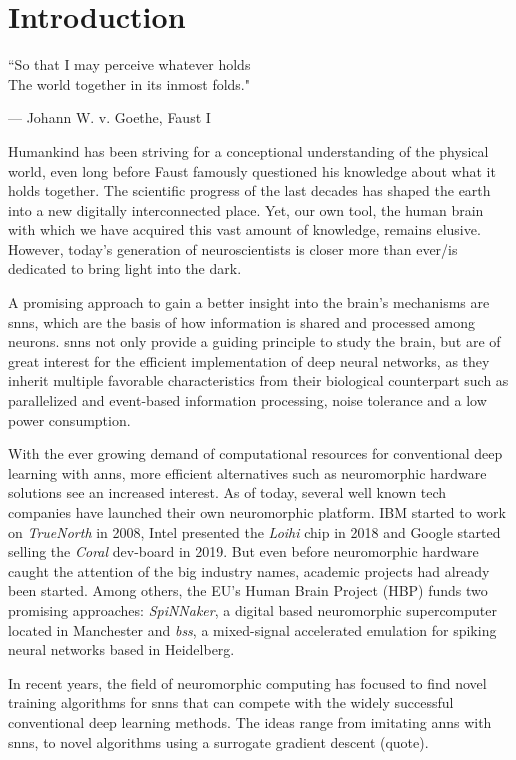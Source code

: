 \chapter*{Introduction}

\epigraph{``So that I may perceive whatever holds \\The world together in its inmost folds."}{--- \textup{Johann W. v. Goethe}, Faust I}

Humankind has been striving for a conceptional understanding of the physical world, even long before Faust famously questioned his knowledge about what it holds together. The scientific progress of the last decades has shaped the earth into a new digitally interconnected place. Yet, our own tool, the human brain with which we have acquired this vast amount of knowledge, remains elusive. However, today's generation of neuroscientists is closer more than ever/is dedicated to bring light into the dark.

A promising approach to gain a better insight into the brain's mechanisms are \glspl{snn}, which are the basis of how information is shared and processed among neurons. \glspl{snn} not only provide a guiding principle to study the brain, but are of great interest for the efficient implementation of deep neural networks, as they inherit multiple favorable characteristics from their biological counterpart such as parallelized and event-based information processing, noise tolerance and a low power consumption.

With the ever growing demand of computational resources for conventional deep learning with \glspl{ann}, more efficient alternatives such as neuromorphic hardware solutions see an increased interest. As of today, several well known tech companies have launched their own neuromorphic platform. IBM started to work on \emph{TrueNorth} in 2008, Intel presented the \emph{Loihi} chip in 2018 and Google started selling the \emph{Coral} dev-board in 2019. But even before neuromorphic hardware caught the attention of the big industry names, academic projects had already been started. Among others, the EU's Human Brain Project (HBP) funds two promising approaches: \emph{SpiNNaker}, a digital based neuromorphic supercomputer located in Manchester and \emph{\gls{bss}}, a mixed-signal accelerated emulation for spiking neural networks based in Heidelberg.

In recent years, the field of neuromorphic computing has focused to find novel training algorithms for \glspl{snn} that can compete with the widely successful conventional deep learning methods. The ideas range from imitating \glspl{ann} with \glspl{snn}, to novel algorithms using a surrogate gradient descent (quote).

